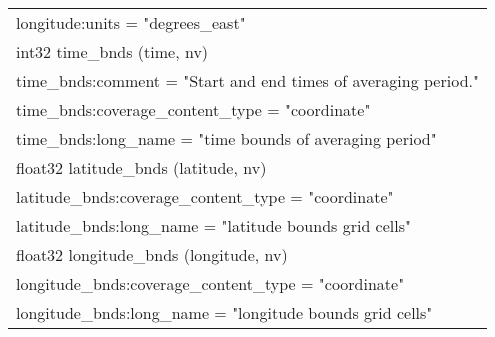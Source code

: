 \begin{longtable}{|p{\textwidth}|}
\rowcolor{Apricot}\hspace{0.5cm}\hspace{0.5cm}longitude:units = "degrees\_east"\\
\rowcolor{Apricot}\hspace{0.5cm}int32 time\_bnds (time, nv)\\
\rowcolor{Apricot}\hspace{0.5cm}\hspace{0.5cm}time\_bnds:comment = "Start and end times of averaging period."\\
\rowcolor{Apricot}\hspace{0.5cm}\hspace{0.5cm}time\_bnds:coverage\_content\_type = "coordinate"\\
\rowcolor{Apricot}\hspace{0.5cm}\hspace{0.5cm}time\_bnds:long\_name = "time bounds of averaging period"\\
\rowcolor{Apricot}\hspace{0.5cm}float32 latitude\_bnds (latitude, nv)\\
\rowcolor{Apricot}\hspace{0.5cm}\hspace{0.5cm}latitude\_bnds:coverage\_content\_type = "coordinate"\\
\rowcolor{Apricot}\hspace{0.5cm}\hspace{0.5cm}latitude\_bnds:long\_name = "latitude bounds grid cells"\\
\rowcolor{Apricot}\hspace{0.5cm}float32 longitude\_bnds (longitude, nv)\\
\rowcolor{Apricot}\hspace{0.5cm}\hspace{0.5cm}longitude\_bnds:coverage\_content\_type = "coordinate"\\
\rowcolor{Apricot}\hspace{0.5cm}\hspace{0.5cm}longitude\_bnds:long\_name = "longitude bounds grid cells"\\
\hline


\end{longtable}

